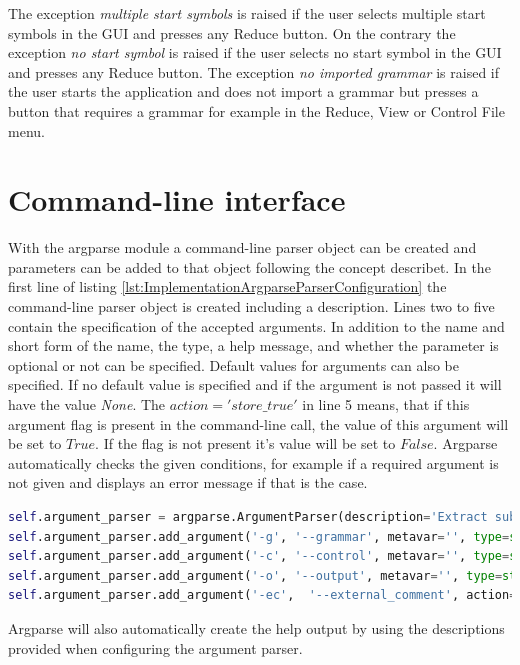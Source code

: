 The exception \textit{multiple start symbols} is raised if the user selects multiple start symbols in the GUI and presses any Reduce button. On the contrary the exception \textit{no start symbol} is raised if the user selects no start symbol in the GUI and presses any Reduce button. The exception \textit{no imported grammar} is raised if the user starts the application and does not import a grammar but presses a button that requires a grammar for example in the Reduce, View or Control File menu.

\section{Command-line interface}\label{sec:ImplementationCommandLineInterface}

With the argparse module a command-line parser object can be created and parameters can be added to that object following the concept describet.
In the first line of listing \ref{lst:ImplementationArgparseParserConfiguration} the command-line parser object is created including a description.
Lines two to five contain the specification of the accepted arguments.
In addition to the name and short form of the name, the type, a help message, and whether the parameter is optional or not can be specified.
Default values for arguments can also be specified.
If no default value is specified and if the argument is not passed it will have the value \textit{None}.
The $action = 'store\_true'$ in line 5 means, that if this argument flag is present in the command-line call, the value of this argument will be set to $True$.
If the flag is not present it's value will be set to $False$.
Argparse automatically checks the given conditions, for example if a required argument is not given and displays an error message if that is the case.

\begin{lstlisting}[language=Python, basicstyle=\scriptsize	,caption= Argparse command-line parser configuration,label= lst:ImplementationArgparseParserConfiguration]
self.argument_parser = argparse.ArgumentParser(description='Extract sub-syntax using TPTP syntax file and a control file')
self.argument_parser.add_argument('-g', '--grammar', metavar='', type=str, required=True, help='path of the TPTP syntax file')
self.argument_parser.add_argument('-c', '--control', metavar='', type=str, required=True, help='path of the control file')
self.argument_parser.add_argument('-o', '--output', metavar='', type=str, required=False, help='optional output file name (default output.txt)', default= "output.txt")
self.argument_parser.add_argument('-ec',  '--external_comment', action='store_true', help="flag - include external comment syntax")
\end{lstlisting}

Argparse will also automatically create the help output by using the descriptions provided when configuring the argument parser.
